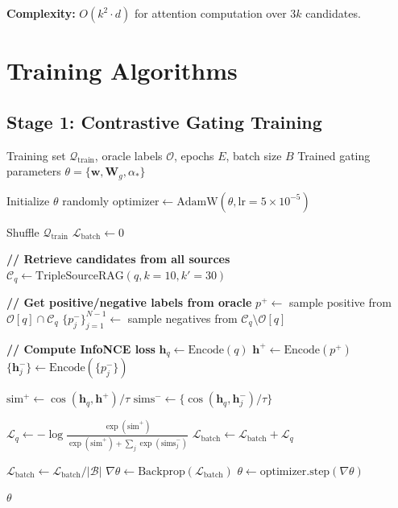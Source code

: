 \documentclass[11pt]{article}
\begin{document}
\textbf{Complexity:} $O(k^2 \cdot d)$ for attention computation over $3k$ candidates.

\section{Training Algorithms}

\subsection{Stage 1: Contrastive Gating Training}

\begin{algorithm}[H]
\caption{Stage1\_ContrastiveGating}
\label{alg:stage1}
\begin{algorithmic}[1]
\REQUIRE Training set $\mathcal{Q}_{\text{train}}$, oracle labels $\mathcal{O}$, epochs $E$, batch size $B$
\ENSURE Trained gating parameters $\theta = \{\mathbf{w}, \mathbf{W}_g, \alpha_{*}\}$

\STATE Initialize $\theta$ randomly
\STATE $\text{optimizer} \leftarrow \text{AdamW}(\theta, \text{lr}=5 \times 10^{-5})$

    \STATE Shuffle $\mathcal{Q}_{\text{train}}$
        \STATE $\mathcal{L}_{\text{batch}} \leftarrow 0$
        
            \STATE \textbf{// Retrieve candidates from all sources}
            \STATE $\mathcal{C}_q \leftarrow \text{TripleSourceRAG}(q, k=10, k'=30)$
            
            \STATE \textbf{// Get positive/negative labels from oracle}
            \STATE $p^+ \leftarrow$ sample positive from $\mathcal{O}[q] \cap \mathcal{C}_q$
            \STATE $\{p^-_j\}_{j=1}^{N-1} \leftarrow$ sample negatives from $\mathcal{C}_q \setminus \mathcal{O}[q]$
            
            \STATE \textbf{// Compute InfoNCE loss}
            \STATE $\mathbf{h}_q \leftarrow \text{Encode}(q)$
            \STATE $\mathbf{h}^+ \leftarrow \text{Encode}(p^+)$
            \STATE $\{\mathbf{h}^-_j\} \leftarrow \text{Encode}(\{p^-_j\})$
            
            \STATE $\text{sim}^+ \leftarrow \cos(\mathbf{h}_q, \mathbf{h}^+) / \tau$
            \STATE $\text{sims}^- \leftarrow \{\cos(\mathbf{h}_q, \mathbf{h}^-_j) / \tau\}$
            
            \STATE $\mathcal{L}_q \leftarrow -\log \frac{\exp(\text{sim}^+)}{\exp(\text{sim}^+) + \sum_j \exp(\text{sims}^-_j)}$
            \STATE $\mathcal{L}_{\text{batch}} \leftarrow \mathcal{L}_{\text{batch}} + \mathcal{L}_q$
        \ENDFOR
        
        \STATE $\mathcal{L}_{\text{batch}} \leftarrow \mathcal{L}_{\text{batch}} / |\mathcal{B}|$ 
        \STATE $\nabla\theta \leftarrow \text{Backprop}(\mathcal{L}_{\text{batch}})$
        \STATE $\theta \leftarrow \text{optimizer.step}(\nabla\theta)$
    \ENDFOR
\ENDFOR

\RETURN $\theta$
\end{algorithmic}
\end{algorithm}
\end{document}
